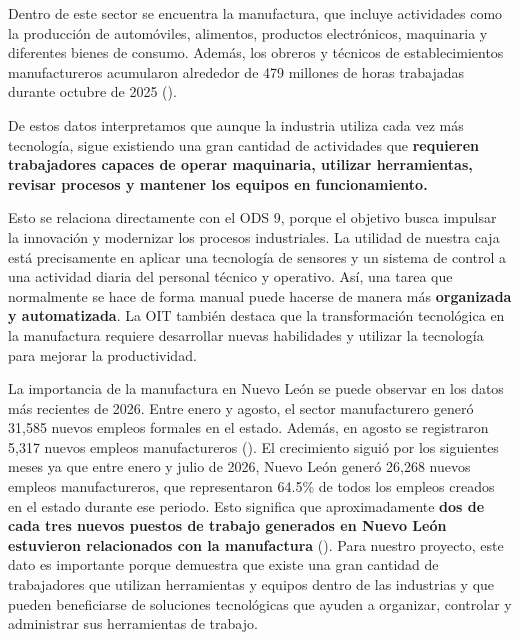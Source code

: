 \vspace{0.5 em}

Dentro de este sector se encuentra la manufactura, que incluye actividades como la producción de automóviles, alimentos, productos electrónicos, maquinaria y diferentes bienes de consumo. Además, los obreros y técnicos de establecimientos manufactureros acumularon alrededor de 479 millones de horas trabajadas durante octubre de 2025 (\cite{inegi_immex_2025}). 

\vspace{0.5 em}

De estos datos interpretamos que aunque la industria utiliza cada vez más tecnología, sigue existiendo una gran cantidad de actividades que \textbf{requieren trabajadores capaces de operar maquinaria, utilizar herramientas, revisar procesos y mantener los equipos en funcionamiento.}

\vspace{0.5 em}

Esto se relaciona directamente con el ODS 9, porque el objetivo busca impulsar la innovación y modernizar los procesos industriales. La utilidad de nuestra caja está precisamente en aplicar una tecnología de sensores y un sistema de control a una actividad diaria del personal técnico y operativo. Así, una tarea que normalmente se hace de forma manual puede hacerse de manera más \textbf{organizada y automatizada}. La OIT también destaca que la transformación tecnológica en la manufactura requiere desarrollar nuevas habilidades y utilizar la tecnología para mejorar la productividad.


La importancia de la manufactura en Nuevo León se puede observar en los datos más recientes de 2026. Entre enero y agosto, el sector manufacturero generó 31,585 nuevos empleos formales en el estado. Además, en agosto se registraron 5,317 nuevos empleos manufactureros (\cite{gob_nl_empleo_septiembre_2026}). El crecimiento siguió por los siguientes meses ya que entre enero y julio de 2026, Nuevo León generó 26,268 nuevos empleos manufactureros, que representaron 64.5\% de todos los empleos creados en el estado durante ese periodo. Esto significa que aproximadamente \textbf{dos de cada tres nuevos puestos de trabajo generados en Nuevo León estuvieron relacionados con la manufactura} (\cite{gob_nl_ano_manufacturero_2026}). Para nuestro proyecto, este dato es importante porque demuestra que existe una gran cantidad de trabajadores que utilizan herramientas y equipos dentro de las industrias y que pueden beneficiarse de soluciones tecnológicas que ayuden a organizar, controlar y administrar sus herramientas de trabajo.

